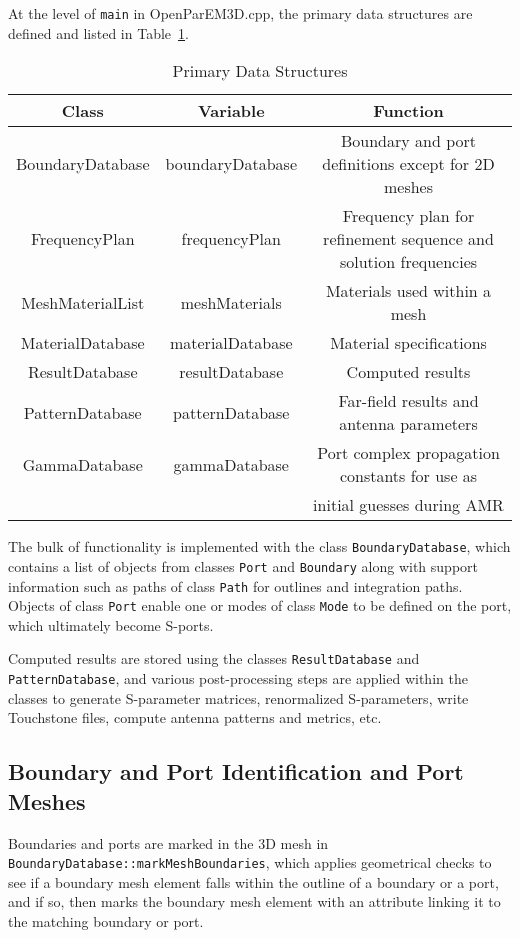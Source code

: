 \documentclass[titlepage]{article}
\renewcommand\_{\textunderscore\linebreak[1]}
\begin{document}
At the level of \texttt{main} in OpenParEM3D.cpp, the primary data structures are defined and listed in Table~\ref{table:data_structures}.
\begin{table}
\small
\caption{Primary Data Structures}
\begin{center}
\begin{tabular}{|c|c|c|}
\hline
Class & Variable & Function \\
\hline
BoundaryDatabase & boundaryDatabase & Boundary and port definitions except for 2D meshes \\
FrequencyPlan & frequencyPlan & Frequency plan for refinement sequence and solution frequencies \\
MeshMaterialList & meshMaterials & Materials used within a mesh \\
MaterialDatabase & materialDatabase & Material specifications \\
ResultDatabase & resultDatabase & Computed results \\
PatternDatabase & patternDatabase & Far-field results and antenna parameters \\
GammaDatabase & gammaDatabase & Port complex propagation constants for use as\\
              &               & initial guesses during AMR \\
\hline
\end{tabular}
\end{center}
\label{table:data_structures}
\end{table}
The bulk of functionality is implemented with the class \texttt{BoundaryDatabase}, which contains a list of objects from classes \texttt{Port} and \texttt{Boundary} along with support information such as paths of class \texttt{Path} for outlines and integration paths.  Objects of class \texttt{Port} enable one or modes of class \texttt{Mode} to be defined on the port, which ultimately become S-ports.

Computed results are stored using the classes \texttt{ResultDatabase} and \texttt{PatternDatabase}, and various post-processing steps are applied within the classes to generate S-parameter matrices, renormalized S-parameters, write Touchstone files, compute antenna patterns and metrics, etc.

\subsection{Boundary and Port Identification and Port Meshes}

Boundaries and ports are marked in the 3D mesh in \texttt{BoundaryDatabase::markMeshBoundaries}, which applies geometrical checks to see if a boundary mesh element falls within the outline of a boundary or a port, and if so, then marks the boundary mesh element with an attribute linking it to the matching boundary or port.
\end{document}
